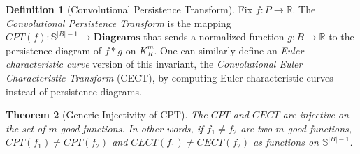 \documentclass[conference]{IEEEtran}
\newtheorem{theorem}{Theorem}[section]
\theoremstyle{definition}
\newtheorem{definition}[theorem]{Definition}
\numberwithin{figure}{section}
\begin{document}
\begin{definition}[Convolutional Persistence Transform]
Fix $f: P \to \mathbb{R}$. The \emph{Convolutional Persistence Transform}  is the mapping $CPT(f): \mathbb{S}^{|B|-1} \to \mathbf{Diagrams}$ that sends a normalized function $g: B \to \mathbb{R}$ to the persistence diagram of $f \ast g$ on $K_{R}^{m}$. One can similarly define an \emph{Euler characteristic curve} version of this invariant, the \emph{Convolutional Euler Characteristic Transform} (CECT), by computing Euler characteristic curves instead of persistence diagrams. 
\end{definition}

\begin{theorem}[Generic Injectivity of CPT]
The $CPT$ and $CECT$ are injective on the set of $m$-good functions. In other words, if $f_1 \neq f_2$ are two $m$-good functions, $CPT(f_1) \neq CPT(f_2)$ and $CECT(f_1) \neq CECT(f_2)$ as functions on $\mathbb{S}^{|B|-1}$.
\end{theorem}
\end{document}
